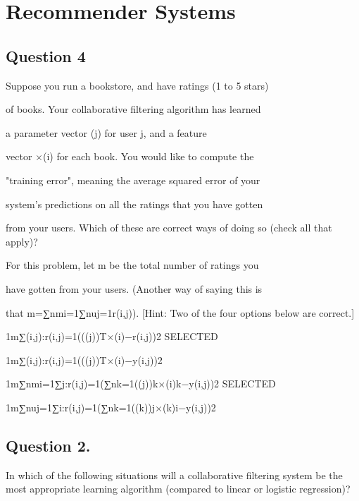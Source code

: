 \documentclass[11pt]{article} %
\begin{document}
\section*{Recommender Systems}



\subsection*{Question 4 }  
Suppose you run a bookstore, and have ratings (1 to 5 stars)

of books. Your collaborative filtering algorithm has learned

a parameter vector \theta(j) for user j, and a feature

vector $ \times $(i) for each book. You would like to compute the

"training error", meaning the average squared error of your

system's predictions on all the ratings that you have gotten

from your users. Which of these are correct ways of doing so (check all that apply)?

For this problem, let m be the total number of ratings you

have gotten from your users. (Another way of saying this is

that m=∑nmi=1∑nuj=1r(i,j)). [Hint: Two of the four options below are correct.]


1m∑(i,j):r(i,j)=1((\theta(j))T$ \times $(i)−r(i,j))2 SELECTED

1m∑(i,j):r(i,j)=1((\theta(j))T$ \times $(i)−y(i,j))2

1m∑nmi=1∑j:r(i,j)=1(∑nk=1(\theta(j))k$ \times $(i)k−y(i,j))2 SELECTED

1m∑nuj=1∑i:r(i,j)=1(∑nk=1(\theta(k))j$ \times $(k)i−y(i,j))2


\subsection*{Question 2. } 

In which of the following situations will a collaborative filtering system be the most appropriate learning algorithm (compared to linear or logistic regression)?
\end{document}
